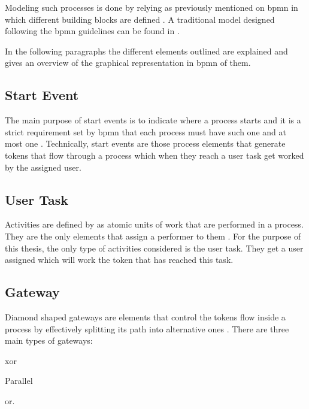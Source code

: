 Modeling such processes is done by relying as previously mentioned on \gls{bpmn} in which different building blocks are defined \citep{Silver2011}. A traditional model designed following the \gls{bpmn} guidelines can be found in .


In the following paragraphs the different elements outlined are explained and  gives an overview of the graphical representation in \gls{bpmn} of them.


\subsection{Start Event}

The main purpose of start events is to indicate where a process starts and it is a strict requirement set by \gls{bpmn} that each process must have such one and at most one \citep{Silver2011}. Technically, start events are those process elements that generate tokens that flow through a process which when they reach a user task get worked by the assigned user.

\subsection{User Task}

Activities are defined by \citet{Silver2011} as atomic units of work that are performed in a process. They are the only elements that assign a performer to them \citep{Silver2011}. For the purpose of this thesis, the only type of activities considered is the user task. They get a user assigned which will work the token that has reached this task.

\subsection{Gateway}

Diamond shaped gateways are elements that control the tokens flow inside a process by effectively splitting its path into alternative ones \citep{Silver2011}. There are three main types of gateways:
\begin{enumerate*}
	\item \gls{xor}
	\item Parallel
	\item \gls{or}.
\end{enumerate*}

